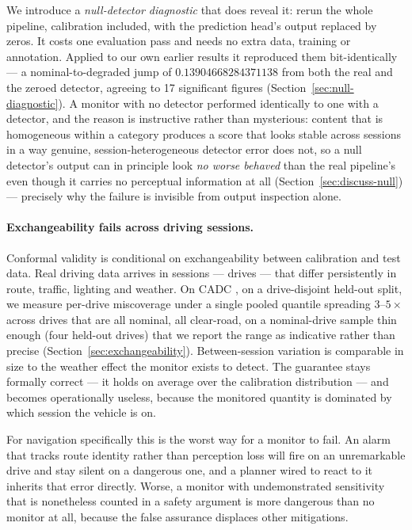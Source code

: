 We introduce a \emph{null-detector diagnostic} that does reveal it: rerun
the whole pipeline, calibration included, with the prediction head's output
replaced by zeros. It costs one evaluation pass and needs no extra data,
training or annotation. Applied to our own earlier results it reproduced
them bit-identically --- a nominal-to-degraded jump of
$0.13904668284371138$ from both the real and the zeroed detector, agreeing
to 17 significant figures (Section~\ref{sec:null-diagnostic}). A monitor
with no detector performed identically to one with a detector, and the
reason is instructive rather than mysterious: content that is homogeneous
within a category produces a score that looks stable across sessions in a
way genuine, session-heterogeneous detector error does not, so a null
detector's output can in principle look \emph{no worse behaved} than the
real pipeline's even though it carries no perceptual information at all
(Section~\ref{sec:discuss-null}) --- precisely why the failure is invisible
from output inspection alone.

\paragraph{Exchangeability fails across driving sessions.}
Conformal validity is conditional on exchangeability between calibration
and test data. Real driving data arrives in sessions --- drives --- that
differ persistently in route, traffic, lighting and weather. On CADC
\cite{Pitropov2021CADC}, on a drive-disjoint held-out split, we measure
per-drive miscoverage under a single pooled quantile spreading $3$--$5\times$
across drives that are all nominal, all clear-road, on a nominal-drive
sample thin enough (four held-out drives) that we report the range as
indicative rather than precise (Section~\ref{sec:exchangeability}).
Between-session variation is comparable in size to the weather effect the
monitor exists to detect. The guarantee stays formally correct --- it holds
on average over the calibration distribution --- and becomes operationally
useless, because the monitored quantity is dominated by which session the
vehicle is on.

For navigation specifically this is the worst way for a monitor to fail.
An alarm that tracks route identity rather than perception loss will fire
on an unremarkable drive and stay silent on a dangerous one, and a planner
wired to react to it inherits that error directly. Worse, a monitor with
undemonstrated sensitivity that is nonetheless counted in a safety
argument is more dangerous than no monitor at all, because the false
assurance displaces other mitigations.

